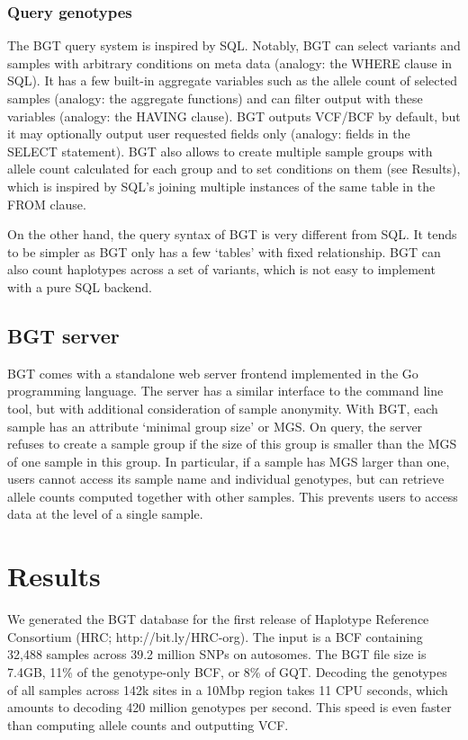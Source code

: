 \documentclass{bioinfo}
\begin{document}
\begin{methods}
\subsubsection{Query genotypes}

The BGT query system is inspired by SQL.  Notably, BGT can select variants and
samples with arbitrary conditions on meta data (analogy: the {\sf WHERE} clause
in SQL). It has a few built-in aggregate variables such as the allele count of
selected samples (analogy: the aggregate functions) and can filter output with
these variables (analogy: the {\sf HAVING} clause). BGT outputs VCF/BCF by
default, but it may optionally output user requested fields only (analogy:
fields in the {\sf SELECT} statement). BGT also allows to create multiple
sample groups with allele count calculated for each group and to set conditions
on them (see Results), which is inspired by SQL's joining multiple instances of
the same table in the {\sf FROM} clause.

On the other hand, the query syntax of BGT is very different from SQL. It tends
to be simpler as BGT only has a few `tables' with fixed relationship. BGT can
also count haplotypes across a set of variants, which is not easy to
implement with a pure SQL backend.

\subsection{BGT server}

BGT comes with a standalone web server frontend implemented in the Go
programming language. The server has a similar interface to the command line
tool, but with additional consideration of sample anonymity. With BGT,
each sample has an attribute `minimal group size' or MGS. On query, the server
refuses to create a sample group if the size of this group is smaller than the
MGS of one sample in this group. In particular, if a sample has MGS larger than
one, users cannot access its sample name and individual genotypes, but can
retrieve allele counts computed together with other samples. This prevents
users to access data at the level of a single sample.

\end{methods}

\section{Results}

We generated the BGT database for the first release of Haplotype Reference
Consortium (HRC; http://bit.ly/HRC-org). The input is a BCF containing 32,488
samples across 39.2 million SNPs on autosomes. The BGT file size is 7.4GB, 11\%
of the genotype-only BCF, or 8\% of GQT. Decoding the genotypes of all samples
across 142k sites in a 10Mbp region takes 11 CPU seconds, which amounts to
decoding 420 million genotypes per second. This speed is even faster than
computing allele counts and outputting VCF.
\end{document}
